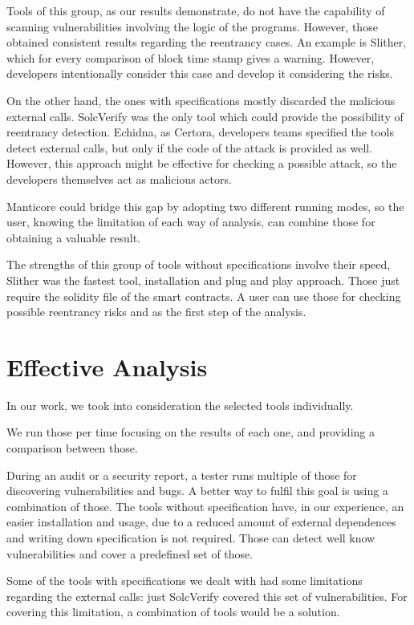 Tools of this group, as our results demonstrate, do not have the capability of scanning vulnerabilities involving the logic of the programs. 
However, those obtained consistent results regarding the reentrancy cases. 
An example is Slither, which for every comparison of block time stamp gives a warning. However, developers intentionally consider this case and develop it considering the risks. 

On the other hand, the ones with specifications mostly discarded the malicious external calls. 
SolcVerify was the only tool which could provide the possibility of reentrancy detection. Echidna, as Certora, developers teams specified the tools detect external calls, but only if the code of the attack is provided as well.
However, this approach might be effective for checking a possible attack, so the developers themselves act as malicious actors.

Manticore could bridge this gap by adopting two different running modes, so the user, knowing the limitation of each way of analysis, can combine those for obtaining a valuable result.

The strengths of this group of tools without specifications involve their speed, Slither was the fastest tool, installation and plug and play approach. 
Those just require the solidity file of the smart contracts. A user can use those for checking possible reentrancy risks and as the first step of the analysis.

\section{Effective Analysis}
In our work, we took into consideration the selected tools individually. 

We run those per time focusing on the results of each one, and providing a comparison between those.

During an audit or a security report, a tester runs multiple of those for discovering vulnerabilities and bugs. 
A better way to fulfil this goal is using a combination of those. 
The tools without specification have, in our experience, an easier installation and usage, 
due to a reduced amount of external dependences and writing down specification is not required.
Those can detect well know vulnerabilities and cover a predefined set of those. 

Some of the tools with specifications we dealt with had some limitations regarding the external calls: just SolcVerify covered this set of vulnerabilities. 
For covering this limitation, a combination of tools would be a solution. 

